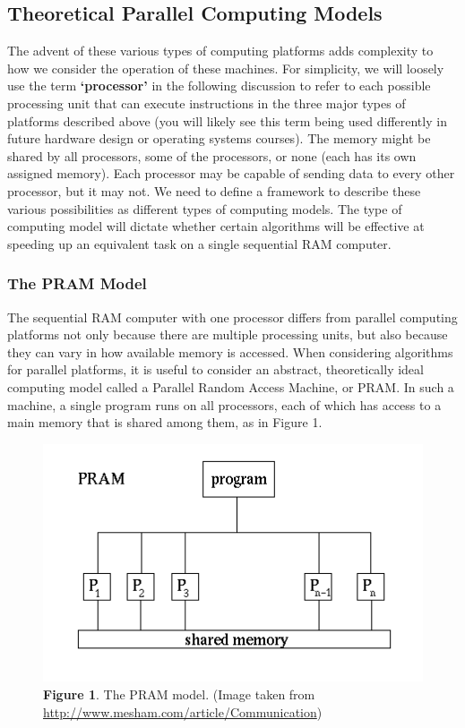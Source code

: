 \documentclass[letterpaper,10pt,openany,oneside]{sphinxmanual}
\begin{document}
\subsection{Theoretical Parallel Computing Models}
\label{ParallelMachineModels/ParallelMachineModels:theoretical-parallel-computing-models}
The advent of these various types of computing platforms adds complexity to how we consider the operation of these machines.  For simplicity, we will loosely use the term \textbf{‘processor’} in the following discussion to refer to each possible processing unit that can execute instructions in the three major types of platforms described above (you will likely see this term being used differently in future hardware design or operating systems courses).  The memory might be shared by all processors, some of the processors, or none (each has its own assigned memory). Each processor may be capable of sending data to every other processor, but it may not.  We need to define a framework to describe these various possibilities as different types of computing models.  The type of computing model will dictate whether certain algorithms will be effective at speeding up an equivalent task on a single sequential  RAM computer.


\subsubsection{The PRAM Model}
\label{ParallelMachineModels/ParallelMachineModels:the-pram-model}
The sequential RAM computer with one processor differs from parallel computing platforms not only because there are multiple processing units, but also because they can vary in how available memory is accessed. When considering algorithms for parallel platforms, it is useful to consider an abstract, theoretically ideal computing model called a Parallel Random Access Machine, or PRAM. In such a machine, a single program runs on all processors, each of which has access to a main memory that is shared among them, as in Figure 1.
\begin{figure}[htbp]
\centering
\capstart

\includegraphics{Figure1.png}
\caption{\textbf{Figure 1}. The PRAM model. (Image taken from \href{http://www.mesham.com/article/Communication}{http://www.mesham.com/article/Communication})}\end{figure}
\end{document}
